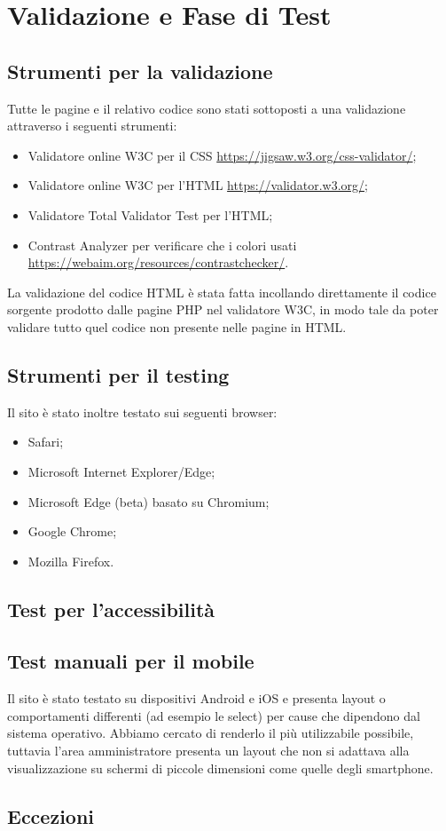 \section{Validazione e Fase di Test}

\subsection{Strumenti per la validazione}
Tutte le pagine e il relativo codice sono stati sottoposti a una validazione attraverso i seguenti strumenti:
\begin{itemize}
	\item Validatore online W3C per il CSS \url{https://jigsaw.w3.org/css-validator/};
	\item Validatore online W3C per l'HTML \url{https://validator.w3.org/};
	\item Validatore Total Validator Test per l'HTML;
	\item Contrast Analyzer per verificare che i colori usati \url{https://webaim.org/resources/contrastchecker/}.
\end{itemize}
La validazione del codice HTML è stata fatta incollando direttamente il codice sorgente prodotto dalle pagine PHP nel validatore W3C, in modo tale da poter validare tutto quel codice non presente nelle pagine in HTML.

\subsection{Strumenti per il testing}
Il sito è stato inoltre testato sui seguenti browser:
\begin{itemize}
	\item Safari;
	\item Microsoft Internet Explorer/Edge;
	\item Microsoft Edge (beta) basato su Chromium;
	\item Google Chrome;
	\item Mozilla Firefox.
\end{itemize}

\subsection{Test per l'accessibilità}

\subsection{Test manuali per il mobile}
Il sito è stato testato su dispositivi Android e iOS e presenta layout o comportamenti differenti (ad esempio le select) per cause che dipendono dal sistema operativo. Abbiamo cercato di renderlo il più utilizzabile possibile, tuttavia l'area amministratore presenta un layout che non si adattava alla visualizzazione su schermi di piccole dimensioni come quelle degli smartphone.

\subsection{Eccezioni}

\pagebreak